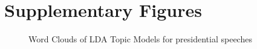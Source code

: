 \documentclass{article}
\begin{document}
\section{Supplementary Figures}{
\begin{figure}[!htb]
	\caption{\label{fig:my-label5} Word Clouds of LDA Topic Models for presidential speeches}
\end{figure}

}
\end{document}
